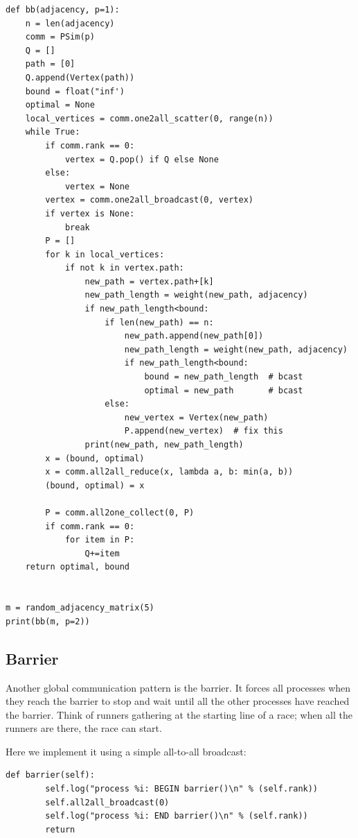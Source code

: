 \documentclass[justified, sixbynine]{tufte-book}
\def\ft{\small\tt}
\theoremstyle{plain}%
\newtheorem * {corollary}{Corollary}
\theoremstyle{definition}
\theoremstyle{remark}
\newtheorem * {remark}{Remark}
\newtheorem * {note}{Note}
\begin{document}
\begin{fullwidth}
\begin{lstlisting}[caption={in file: {\ft psim\_prim.py}}]
def bb(adjacency, p=1):
    n = len(adjacency)
    comm = PSim(p)
    Q = []
    path = [0]
    Q.append(Vertex(path))
    bound = float("inf')
    optimal = None
    local_vertices = comm.one2all_scatter(0, range(n))
    while True:
        if comm.rank == 0:
            vertex = Q.pop() if Q else None
        else:
            vertex = None
        vertex = comm.one2all_broadcast(0, vertex)
        if vertex is None:
            break
        P = []
        for k in local_vertices:
            if not k in vertex.path:
                new_path = vertex.path+[k]
                new_path_length = weight(new_path, adjacency)
                if new_path_length<bound:
                    if len(new_path) == n:
                        new_path.append(new_path[0])
                        new_path_length = weight(new_path, adjacency)
                        if new_path_length<bound:
                            bound = new_path_length  # bcast
                            optimal = new_path       # bcast
                    else:
                        new_vertex = Vertex(new_path)
                        P.append(new_vertex)  # fix this
                print(new_path, new_path_length)
        x = (bound, optimal)
        x = comm.all2all_reduce(x, lambda a, b: min(a, b))
        (bound, optimal) = x

        P = comm.all2one_collect(0, P)
        if comm.rank == 0:
            for item in P:
                Q+=item
    return optimal, bound


m = random_adjacency_matrix(5)
print(bb(m, p=2))
\end{lstlisting}

\goodbreak\subsection{Barrier}

Another global communication pattern is the barrier. It forces all processes when they reach the barrier to stop and wait until all the other processes have reached the barrier. Think of runners gathering at the  starting line  of a race; when  all the runners are there, the race can start.

Here we implement it using a simple all-to-all broadcast:

\begin{lstlisting}[caption={in file: {\ft psim.py}}]
    def barrier(self):
        self.log("process %i: BEGIN barrier()\n" % (self.rank))
        self.all2all_broadcast(0)
        self.log("process %i: END barrier()\n" % (self.rank))
        return
\end{lstlisting}


\end{fullwidth}
\end{document}
